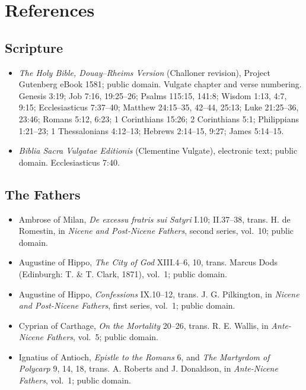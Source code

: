 \section{References}

\begingroup
\setlength{\parskip}{0pt}
\titlespacing*{\subsection}{0pt}{1.0ex}{0.3ex}

\subsection*{Scripture}

{\fontsize{8.6}{9.6}\selectfont
\begin{itemize}[itemsep=0pt,parsep=0pt,topsep=0.05em]
\item \emph{The Holy Bible, Douay--Rheims Version} (Challoner revision), Project Gutenberg eBook 1581; public domain. Vulgate chapter and verse numbering. Genesis 3:19; Job 7:16, 19:25--26; Psalms 115:15, 141:8; Wisdom 1:13, 4:7, 9:15; Ecclesiasticus 7:37--40; Matthew 24:15--35, 42--44, 25:13; Luke 21:25--36, 23:46; Romans 5:12, 6:23; 1 Corinthians 15:26; 2 Corinthians 5:1; Philippians 1:21--23; 1 Thessalonians 4:12--13; Hebrews 2:14--15, 9:27; James 5:14--15.
\item \emph{Biblia Sacra Vulgatae Editionis} (Clementine Vulgate), electronic text; public domain. Ecclesiasticus 7:40.
\end{itemize}}

\subsection*{The Fathers}

{\fontsize{8.6}{9.6}\selectfont
\begin{itemize}[itemsep=0pt,parsep=0pt,topsep=0.05em]
\item Ambrose of Milan, \emph{De excessu fratris sui Satyri} I.10; II.37--38, trans. H. de Romestin, in \emph{Nicene and Post-Nicene Fathers}, second series, vol.~10; public domain.
\item Augustine of Hippo, \emph{The City of God} XIII.4--6, 10, trans. Marcus Dods (Edinburgh: T. \& T. Clark, 1871), vol.~1; public domain.
\item Augustine of Hippo, \emph{Confessions} IX.10--12, trans. J. G. Pilkington, in \emph{Nicene and Post-Nicene Fathers}, first series, vol.~1; public domain.
\item Cyprian of Carthage, \emph{On the Mortality} 20--26, trans. R. E. Wallis, in \emph{Ante-Nicene Fathers}, vol.~5; public domain.
\item Ignatius of Antioch, \emph{Epistle to the Romans} 6, and \emph{The Martyrdom of Polycarp} 9, 14, 18, trans. A. Roberts and J. Donaldson, in \emph{Ante-Nicene Fathers}, vol.~1; public domain.
\end{itemize}}


